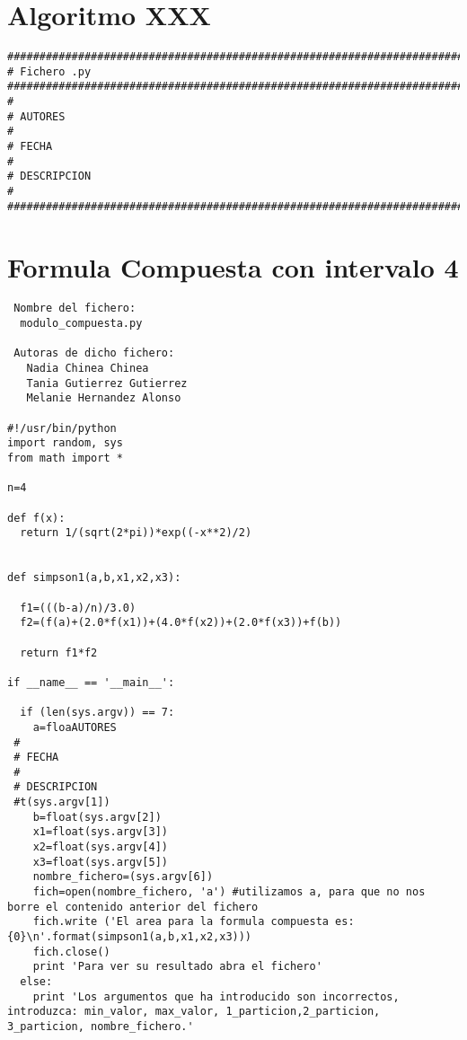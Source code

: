 \section{Algoritmo XXX}
\label{Apendice1:XXX}

\begin{center}
\begin{footnotesize}
\begin{verbatim}
###################################################################################
# Fichero .py
###################################################################################
#
# AUTORES
#   
# FECHA
#
# DESCRIPCION
#
###################################################################################
\end{verbatim}
\end{footnotesize}
\end{center}



\section{Formula Compuesta con intervalo 4 }
\label{sec2}
\begin{center}
\begin{footnotesize}
\begin{verbatim}
 Nombre del fichero:
  modulo_compuesta.py

 Autoras de dicho fichero:
   Nadia Chinea Chinea 
   Tania Gutierrez Gutierrez 
   Melanie Hernandez Alonso
  
#!/usr/bin/python
import random, sys
from math import *

n=4

def f(x):
  return 1/(sqrt(2*pi))*exp((-x**2)/2)
  
  
def simpson1(a,b,x1,x2,x3):
  
  f1=(((b-a)/n)/3.0)
  f2=(f(a)+(2.0*f(x1))+(4.0*f(x2))+(2.0*f(x3))+f(b))
  
  return f1*f2 
      
if __name__ == '__main__':
  
  if (len(sys.argv)) == 7:
    a=floaAUTORES
 #
 # FECHA
 #
 # DESCRIPCION
 #t(sys.argv[1])
    b=float(sys.argv[2])
    x1=float(sys.argv[3])
    x2=float(sys.argv[4])
    x3=float(sys.argv[5])
    nombre_fichero=(sys.argv[6])
    fich=open(nombre_fichero, 'a') #utilizamos a, para que no nos borre el contenido anterior del fichero
    fich.write ('El area para la formula compuesta es:{0}\n'.format(simpson1(a,b,x1,x2,x3)))
    fich.close()
    print 'Para ver su resultado abra el fichero'
  else:
    print 'Los argumentos que ha introducido son incorrectos, introduzca: min_valor, max_valor, 1_particion,2_particion, 3_particion, nombre_fichero.'
\end{verbatim}
\end{footnotesize}
\end{center}


